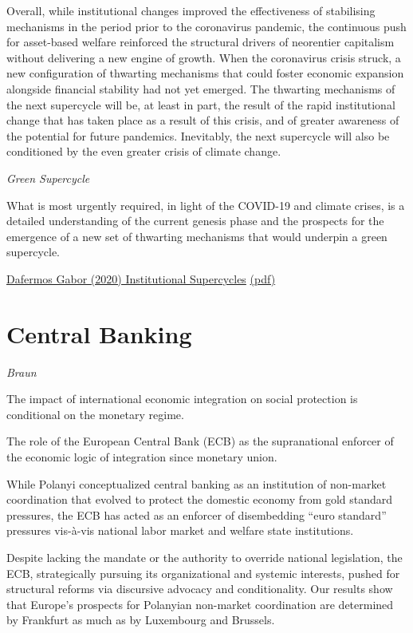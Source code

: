 \documentclass[
]{book}
\begin{document}
Overall, while institutional changes improved the effectiveness of stabilising mechanisms
in the period prior to the coronavirus pandemic, the continuous push for asset-based welfare
reinforced the structural drivers of neorentier capitalism
without delivering a new engine of growth.
When the coronavirus crisis struck, a new configuration of thwarting mechanisms
that could foster economic expansion alongside financial stability had not yet emerged.
The thwarting mechanisms of the next supercycle will be, at least in part,
the result of the rapid institutional change that has taken place as a result of this crisis,
and of greater awareness of the potential for future pandemics.
Inevitably, the next supercycle will also be conditioned by
the even greater crisis of climate change.

\emph{Green Supercycle}

What is most urgently required, in light of the COVID-19 and
climate crises, is a detailed understanding of the current genesis phase
and the prospects for the emergence of a new set of thwarting mechanisms
that would underpin a green supercycle.

\href{https://www.researchgate.net/publication/343472909_Institutional_supercycles_an_evolutionary_macro-finance_approach}{Dafermos Gabor (2020) Institutional Supercycles}
\href{pdf/Dafermos_Gabor_2021_Institutional_Supercycles.pdf}{(pdf)}

\hypertarget{central-banking}{%
\section{Central Banking}\label{central-banking}}

\emph{Braun}

The impact of international economic integration on social protection is conditional on
the monetary regime.

The role of the European Central Bank (ECB) as the supranational enforcer of the
economic logic of integration since monetary union.

While Polanyi conceptualized central banking as an institution of
non-market coordination that evolved to protect the
domestic economy from gold standard pressures,
the ECB has acted as an enforcer of disembedding ``euro standard'' pressures
vis-à-vis national labor market and welfare state institutions.

Despite lacking the mandate or the authority to override national legislation,
the ECB, strategically pursuing its organizational and systemic interests, pushed
for structural reforms via discursive advocacy and conditionality.
Our results show that
Europe's prospects for Polanyian non-market coordination are determined by Frankfurt
as much as by Luxembourg and Brussels.
\end{document}
